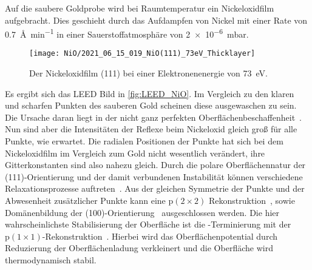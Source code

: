         Auf die saubere Goldprobe wird bei Raumtemperatur ein Nickeloxidfilm aufgebracht.
        Dies geschieht durch das Aufdampfen von Nickel mit einer Rate von \SI{0.7}{\angstrom\per\minute} in einer Sauerstoffatmosphäre von \SI{2e-6}{\milli\bar}.
        \begin{figure}
            \centering
            \texttt{[image: NiO/2021\_06\_15\_019\_NiO(111)\_73eV\_Thicklayer]}
            \caption{Der Nickeloxidfilm (111) bei einer Elektronenenergie von \SI{73}{\electronvolt}.}
            \label{fig:LEED_NiO}
        \end{figure}
        Es ergibt sich das LEED Bild in \autoref{fig:LEED_NiO}.
        Im Vergleich zu den klaren und scharfen Punkten des sauberen Gold scheinen diese ausgewaschen zu sein.
        Die Ursache daran liegt in der nicht ganz perfekten Oberflächenbeschaffenheit~\cite{NiO_34}.
        Nun sind aber die Intensitäten der Reflexe beim Nickeloxid gleich groß für alle Punkte, wie erwartet.
        Die radialen Positionen der Punkte hat sich bei dem Nickeloxidfilm im Vergleich zum Gold nicht wesentlich verändert, ihre Gitterkonstanten sind also nahezu gleich.
        Durch die polare Oberflächennatur der (111)-Orientierung und der damit verbundenen Instabilität können verschiedene Relaxationsprozesse auftreten~\cite{NiO_36, NiO_35, NiO_34, NiO_27, NiO_10}.
        Aus der gleichen Symmetrie der Punkte und der Abwesenheit zusätzlicher Punkte kann eine $\text{p}(2 \times 2)$ Rekonstruktion~\cite{NiO_37}, sowie Domänenbildung der (100)-Orientierung~\cite{NiO_36} ausgeschlossen werden.
        Die hier wahrscheinlichste Stabilisierung der Oberfläche ist die -Terminierung mit der $\text{p}(1 \times 1)$-Rekonstruktion~\cite{NiO_35}.
        Hierbei wird das Oberflächenpotential durch Reduzierung der Oberflächenladung verkleinert und die Oberfläche wird thermodynamisch stabil.

